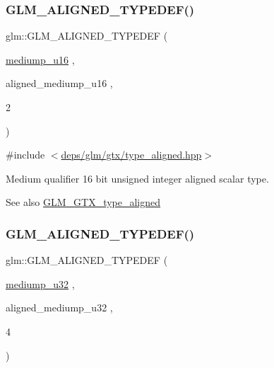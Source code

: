 \subsubsection{\texorpdfstring{G\+L\+M\+\_\+\+A\+L\+I\+G\+N\+E\+D\+\_\+\+T\+Y\+P\+E\+D\+E\+F()}{GLM\_ALIGNED\_TYPEDEF()}\hspace{0.1cm}{\footnotesize\ttfamily [90/209]}}
{\footnotesize\ttfamily glm\+::\+G\+L\+M\+\_\+\+A\+L\+I\+G\+N\+E\+D\+\_\+\+T\+Y\+P\+E\+D\+EF (\begin{DoxyParamCaption}\item[{\hyperlink{group__gtc__type__precision_ga6745262ef6a6fdb8637b2387ef924828}{mediump\+\_\+u16}}]{,  }\item[{aligned\+\_\+mediump\+\_\+u16}]{,  }\item[{2}]{ }\end{DoxyParamCaption})}



{\ttfamily \#include $<$\hyperlink{gtx_2type__aligned_8hpp}{deps/glm/gtx/type\+\_\+aligned.\+hpp}$>$}

Medium qualifier 16 bit unsigned integer aligned scalar type. \begin{DoxySeeAlso}{See also}
\hyperlink{group__gtx__type__aligned}{G\+L\+M\+\_\+\+G\+T\+X\+\_\+type\+\_\+aligned} 
\end{DoxySeeAlso}
\mbox{\label{group__gtx__type__aligned_gad6a7c0b5630f89d3f1c5b4ef2919bb4c}} 
\subsubsection{\texorpdfstring{G\+L\+M\+\_\+\+A\+L\+I\+G\+N\+E\+D\+\_\+\+T\+Y\+P\+E\+D\+E\+F()}{GLM\_ALIGNED\_TYPEDEF()}\hspace{0.1cm}{\footnotesize\ttfamily [91/209]}}
{\footnotesize\ttfamily glm\+::\+G\+L\+M\+\_\+\+A\+L\+I\+G\+N\+E\+D\+\_\+\+T\+Y\+P\+E\+D\+EF (\begin{DoxyParamCaption}\item[{\hyperlink{group__gtc__type__precision_gad0c27a525045c299a92306eb4cd7c13a}{mediump\+\_\+u32}}]{,  }\item[{aligned\+\_\+mediump\+\_\+u32}]{,  }\item[{4}]{ }\end{DoxyParamCaption})}



